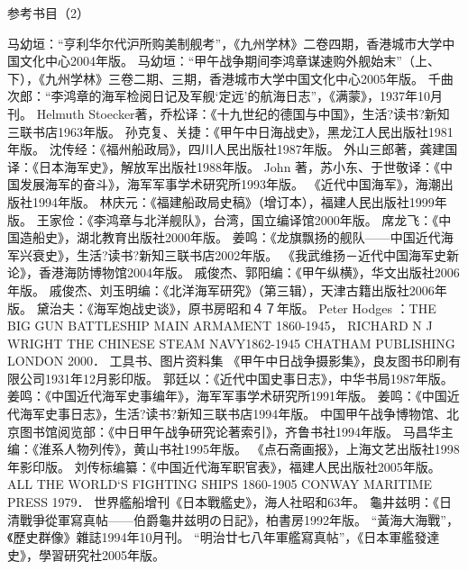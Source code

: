 \documentclass[12pt,UTF8]{ctexbook}
\begin{document}
参考书目（2）

马幼垣：“亨利华尔代沪所购美制舰考”，《九州学林》二卷四期，香港城市大学中国文化中心2004年版。
马幼垣：“甲午战争期间李鸿章谋速购外舰始末”（上、下），《九州学林》三卷二期、三期，香港城市大学中国文化中心2005年版。
千曲次郎：“李鸿章的海军检阅日记及军舰‘定远’的航海日志”，《满蒙》，1937年10月刊。
Helmuth Stoecker著，乔松译：《十九世纪的德国与中国》，生活?读书?新知三联书店1963年版。
孙克复、关捷：《甲午中日海战史》，黑龙江人民出版社1981年版。
沈传经：《福州船政局》，四川人民出版社1987年版。
外山三郎著，龚建国译：《日本海军史》，解放军出版社1988年版。
John 著，苏小东、于世敬译：《中国发展海军的奋斗》，海军军事学术研究所1993年版。
《近代中国海军》，海潮出版社1994年版。
林庆元：《福建船政局史稿》（增订本），福建人民出版社1999年版。
王家俭：《李鸿章与北洋舰队》，台湾，国立编译馆2000年版。
席龙飞：《中国造船史》，湖北教育出版社2000年版。
姜鸣：《龙旗飘扬的舰队——中国近代海军兴衰史》，生活?读书?新知三联书店2002年版。
《我武维扬－近代中国海军史新论》，香港海防博物馆2004年版。
戚俊杰、郭阳编：《甲午纵横》，华文出版社2006年版。
戚俊杰、刘玉明编：《北洋海军研究》（第三辑），天津古籍出版社2006年版。
黛治夫：《海军炮战史谈》，原书房昭和４７年版。
Peter Hodges ：THE BIG GUN BATTLESHIP MAIN ARMAMENT 1860-1945，
RICHARD N J WRIGHT THE CHINESE STEAM NAVY1862-1945 CHATHAM PUBLISHING LONDON 2000．
工具书、图片资料集
《甲午中日战争摄影集》，良友图书印刷有限公司1931年12月影印版。
郭廷以：《近代中国史事日志》，中华书局1987年版。
姜鸣：《中国近代海军史事编年》，海军军事学术研究所1991年版。
姜鸣：《中国近代海军史事日志》，生活?读书?新知三联书店1994年版。
中国甲午战争博物馆、北京图书馆阅览部：《中日甲午战争研究论著索引》，齐鲁书社1994年版。
马昌华主编：《淮系人物列传》，黄山书社1995年版。
《点石斋画报》，上海文艺出版社1998年影印版。
刘传标编纂：《中国近代海军职官表》，福建人民出版社2005年版。
ALL THE WORLD`S FIGHTING SHIPS 1860-1905 CONWAY MARITIME PRESS 1979．
世界艦船增刊《日本戰艦史》，海人社昭和63年。
龜井兹明：《日清戰爭從軍寫真帖——伯爵龜井兹明の日記》，柏書房1992年版。
“黃海大海戰”，《歷史群像》雜誌1994年10月刊。
“明治廿七八年軍艦寫真帖”，《日本軍艦發達史》，學習研究社2005年版。


\backmatter
\end{document}
